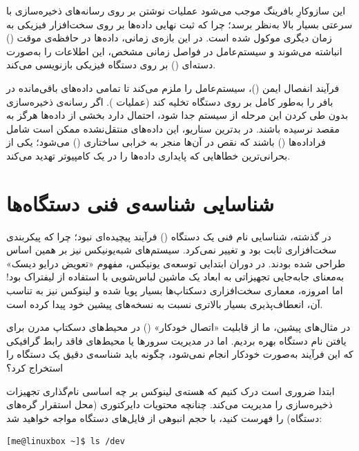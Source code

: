 این سازوکارِ بافرینگ موجب می‌شود عملیات نوشتن بر روی رسانه‌های ذخیره‌سازی با سرعتی بسیار بالا به‌نظر برسد؛ چرا که ثبت نهایی داده‌ها بر روی سخت‌افزار فیزیکی به زمان دیگری موکول شده است. در این بازه‌ی زمانی، داده‌ها در حافظه‌ی موقت () انباشته می‌شوند و سیستم‌عامل در فواصل زمانی مشخص، این اطلاعات را به‌صورت دسته‌ای () بر روی دستگاه فیزیکی بازنویسی می‌کند.

فرآیند انفصال ایمن ()، سیستم‌عامل را ملزم می‌کند تا تمامی داده‌های باقی‌مانده در بافر را به‌طور کامل بر روی دستگاه تخلیه کند (عملیات ). اگر رسانه‌ی ذخیره‌سازی بدون طی کردن این مرحله از سیستم جدا شود، احتمال دارد بخشی از داده‌ها هرگز به مقصد نرسیده باشند. در بدترین سناریو، این داده‌های منتقل‌نشده ممکن است شامل فراداده‌ها () باشند که نقص در آن‌ها منجر به خرابی ساختاری () می‌شود؛ یکی از بحرانی‌ترین خطاهایی که پایداری داده‌ها را در یک کامپیوتر تهدید می‌کند.

\section{شناسایی شناسه‌ی فنی دستگاه‌ها}

در گذشته، شناسایی نام فنی یک دستگاه () فرآیند پیچیده‌ای نبود؛ چرا که پیکربندی سخت‌افزاری ثابت بود و تغییر نمی‌کرد. سیستم‌های شبه‌یونیکس نیز بر همین اساس طراحی شده بودند. در دوران ابتدایی توسعه‌ی یونیکس، مفهوم «تعویض درایو دیسک» به‌معنای جابه‌جایی تجهیزاتی به ابعاد یک ماشین لباس‌شویی با استفاده از لیفتراک بود! اما امروزه، معماری سخت‌افزاری دسکتاپ‌ها بسیار پویا شده و لینوکس نیز به تناسب آن، انعطاف‌پذیری بسیار بالاتری نسبت به نسخه‌های پیشین خود پیدا کرده است.

در مثال‌های پیشین، ما از قابلیت «اتصال خودکار» () در محیط‌های دسکتاپ مدرن برای یافتن نام دستگاه بهره بردیم. اما در مدیریت سرورها یا محیط‌های فاقد رابط گرافیکی که این فرآیند به‌صورت خودکار انجام نمی‌شود، چگونه باید شناسه‌ی دقیق یک دستگاه را استخراج کرد؟

ابتدا ضروری است درک کنیم که هسته‌ی لینوکس بر چه اساسی نام‌گذاری تجهیزات ذخیره‌سازی را مدیریت می‌کند. چنانچه محتویات دایرکتوری  (محل استقرار گره‌های دستگاه) را فهرست کنید، با حجم انبوهی از فایل‌های دستگاه مواجه خواهید شد:

\begin{latin}
\begin{lstlisting}
[me@linuxbox ~]$ ls /dev
\end{lstlisting}
\end{latin}

